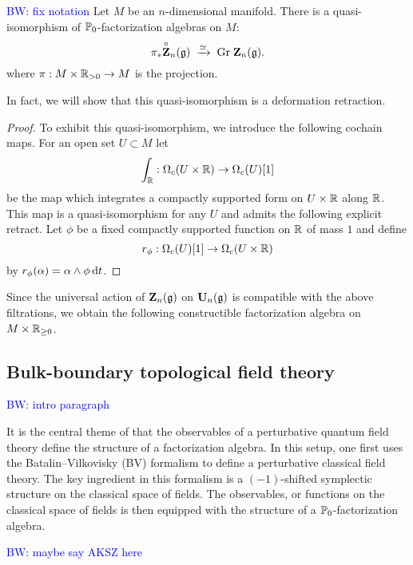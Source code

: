 \documentclass[11pt]{amsart}
\numberwithin{equation}{section}
\def\brian{\textcolor{blue}{BW: }\textcolor{blue}}
\begin{document}
 \begin{lmm}
 \brian{fix notation}
Let $M$ be an $n$-dimensional manifold.
There is a quasi-isomorphism of  $\mathbb P_0$-factorization algebras on $M$:
\[
\pi_* \overset{\circ}{\bf Z}_n(\mathfrak g) \; \xrightarrow{\simeq} \; {\rm Gr} \; \mathbf Z_n(\mathfrak g) .
\]
where $\pi : M \times \mathbb R_{>0} \to M$ is the projection. 
\end{lmm}

In fact, we will show that this quasi-isomorphism is a deformation retraction. 

\begin{proof}
To exhibit this quasi-isomorphism, we introduce the following cochain maps.
For an open set $U \subset M$ let
\[
\int_\mathbb R : \Omega_c(U \times \mathbb R) \to \Omega_c (U) [1] 
\] 
be the map which integrates a compactly supported form on $U \times \mathbb R$ along $\mathbb R$. 
This map is a quasi-isomorphism for any $U $ and admits the following explicit retract. 
Let $\phi$ be a fixed compactly supported function on $\mathbb R$ of mass $1$ and define
\[
r_\phi : \Omega_c(U) [1] \to \Omega_c (U \times \mathbb R)
\]
by $r_\phi (\alpha) = \alpha \wedge \phi \, {\rm d} t$. 
\end{proof}

Since the universal action of $\mathbf Z_n(\mathfrak g)$ on $\mathbf U_n (\mathfrak g)$ is compatible with the above filtrations, we obtain the following constructible factorization algebra on $M \times \mathbb R_{\geq 0}$. 

\subsection{Bulk-boundary topological field theory}

\brian{intro paragraph}

It is the central theme of \cite{CG1, CG2} that the observables of a perturbative quantum field theory define the structure of a factorization algebra. 
In this setup, one first uses the Batalin--Vilkovisky (BV) formalism to define a perturbative classical field theory. 
The key ingredient in this formalism is a $(-1)$-shifted symplectic structure on the classical space of fields. 
The observables, or functions on the classical space of fields is then equipped with the structure of a $\mathbb P_0$-factorization algebra.

\brian{maybe say AKSZ here}
\end{document}

